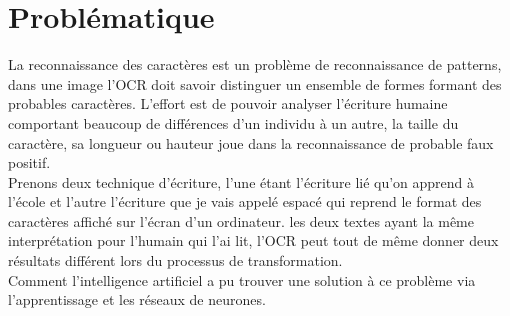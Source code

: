 \section{Problématique}

La reconnaissance des caractères est un problème de reconnaissance de patterns, dans une image l'OCR doit savoir distinguer un ensemble de formes formant des probables caractères. L'effort est de pouvoir analyser l'écriture humaine comportant beaucoup de différences d'un individu à un autre, la taille du caractère, sa longueur ou hauteur joue dans la reconnaissance de probable faux positif.\\ 
Prenons deux technique d'écriture, l'une étant l'écriture lié qu'on apprend à l'école et l'autre l'écriture que je vais appelé espacé qui reprend le format des caractères affiché sur l'écran d'un ordinateur. les deux textes ayant la même interprétation pour l'humain qui l'ai lit, l'OCR peut tout de même donner deux résultats différent lors du processus de transformation.\\
Comment l'intelligence artificiel a pu trouver une solution à ce problème via l'apprentissage et les réseaux de neurones.

\pagebreak
